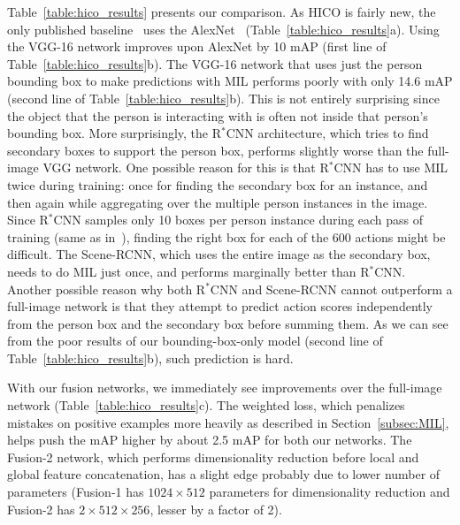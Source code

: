 \documentclass[runningheads]{llncs}
\begin{document}
Table~\ref{table:hico_results} presents our comparison. As HICO is fairly new, the only published baseline~\cite{chao2015hico} uses the AlexNet~\cite{alexnet} (Table~\ref{table:hico_results}a). Using the VGG-16 network improves upon AlexNet by 10 mAP (first line of Table~\ref{table:hico_results}b). The VGG-16 network that uses just the person bounding box to make predictions with MIL performs poorly with only 14.6 mAP (second line of Table~\ref{table:hico_results}b). This is not entirely surprising since the object that the person is interacting with is often not inside that person's bounding box.
More surprisingly, the R$^\ast$CNN architecture, which tries to find secondary boxes to support the person box, performs slightly worse than the full-image VGG network. One possible reason for this is that R$^\ast$CNN has to use MIL twice during training: once for finding the secondary box for an instance, and then again while aggregating over the multiple person instances in the image. Since R$^*$CNN samples only 10 boxes per person instance during each pass of training (same as in~\cite{gkioxari2015rstarcnn}), finding the right box for each of the 600 actions might be difficult. The Scene-RCNN, which uses the entire image as the secondary box, needs to do MIL just once, and performs marginally better than R$^*$CNN. Another possible reason why both R$^*$CNN and Scene-RCNN cannot outperform a full-image network is that they attempt to predict action scores independently from the person box and the secondary box before summing them. As we can see from the poor results of our bounding-box-only model (second line of Table~\ref{table:hico_results}b), such prediction is hard.


With our fusion networks, we immediately see improvements over the full-image network (Table~\ref{table:hico_results}c). The weighted loss, which penalizes mistakes on positive examples more heavily as described in Section~\ref{subsec:MIL}, helps push the mAP higher by about 2.5 mAP for both our networks. The Fusion-2 network, which performs dimensionality reduction before local and global feature concatenation, has a slight edge probably due to lower number of parameters (Fusion-1 has $1024\times 512$ parameters for dimensionality reduction and Fusion-2 has $2\times 512\times 256$, lesser by a factor of 2).
\end{document}
